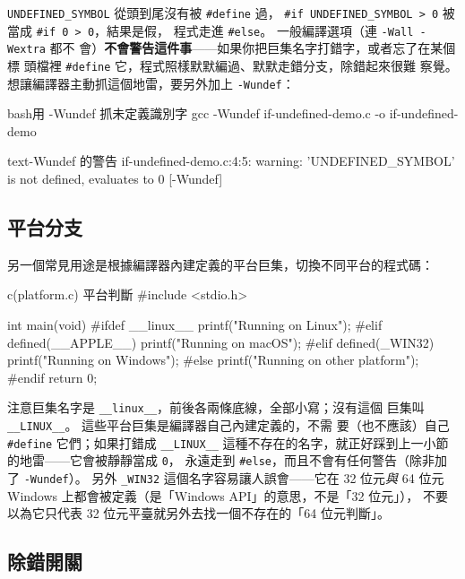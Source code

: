 
\texttt{UNDEFINED\_SYMBOL} 從頭到尾沒有被 \texttt{\#define} 過，
\texttt{\#if UNDEFINED\_SYMBOL > 0} 被當成 \texttt{\#if 0 > 0}，結果是假，
程式走進 \texttt{\#else}。 一般編譯選項（連 \texttt{-Wall -Wextra} 都不
會）\textbf{不會警告這件事}——如果你把巨集名字打錯字，或者忘了在某個標
頭檔裡 \texttt{\#define} 它，程式照樣默默編過、默默走錯分支，除錯起來很難
察覺。 想讓編譯器主動抓這個地雷，要另外加上 \texttt{-Wundef}：

\begin{code}{bash}{用 -Wundef 抓未定義識別字}
gcc -Wundef if-undefined-demo.c -o if-undefined-demo
\end{code}

\begin{code}{text}{-Wundef 的警告}
if-undefined-demo.c:4:5: warning: 'UNDEFINED_SYMBOL' is not defined,
evaluates to 0 [-Wundef]
\end{code}

\subsection{平台分支}

另一個常見用途是根據編譯器內建定義的平台巨集，切換不同平台的程式碼：

\begin{example}{c}{(platform.c) 平台判斷}
#include <stdio.h>

int main(void) {
#ifdef __linux__
    printf("Running on Linux\n");
#elif defined(__APPLE__)
    printf("Running on macOS\n");
#elif defined(_WIN32)
    printf("Running on Windows\n");
#else
    printf("Running on other platform\n");
#endif
    return 0;
}
\end{example}


注意巨集名字是 \texttt{\_\_linux\_\_}，前後各兩條底線，全部小寫；沒有這個
巨集叫 \texttt{\_\_LINUX\_\_}。 這些平台巨集是編譯器自己內建定義的，不需
要（也不應該）自己 \texttt{\#define} 它們；如果打錯成 \texttt{\_\_LINUX\_\_}
這種不存在的名字，就正好踩到上一小節的地雷——它會被靜靜當成 \texttt{0}，
永遠走到 \texttt{\#else}，而且不會有任何警告（除非加了 \texttt{-Wundef}）。
另外 \texttt{\_WIN32} 這個名字容易讓人誤會——它在 32 位元\textit{與} 64
位元 Windows 上都會被定義（是「Windows API」的意思，不是「32 位元」），
不要以為它只代表 32 位元平臺就另外去找一個不存在的「64 位元判斷」。

\subsection{除錯開關}


